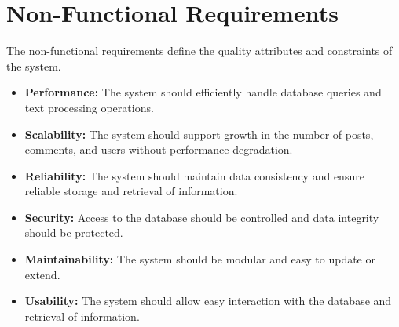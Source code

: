 \section{Non-Functional Requirements}

The non-functional requirements define the quality attributes and constraints of the system.

\begin{itemize}
    \item \textbf{Performance:} The system should efficiently handle database queries and text processing operations.
    \item \textbf{Scalability:} The system should support growth in the number of posts, comments, and users without performance degradation.
    \item \textbf{Reliability:} The system should maintain data consistency and ensure reliable storage and retrieval of information.
    \item \textbf{Security:} Access to the database should be controlled and data integrity should be protected.
    \item \textbf{Maintainability:} The system should be modular and easy to update or extend.
    \item \textbf{Usability:} The system should allow easy interaction with the database and retrieval of information.
\end{itemize}
